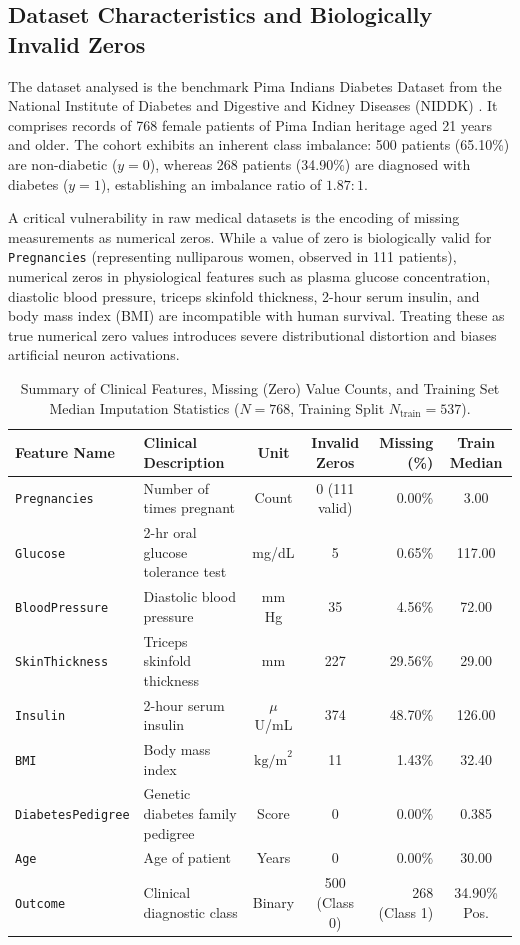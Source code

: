 \documentclass[11pt,a4paper]{article}
\begin{document}
\subsection{Dataset Characteristics and Biologically Invalid Zeros}
The dataset analysed is the benchmark Pima Indians Diabetes Dataset from the National Institute of Diabetes and Digestive and Kidney Diseases (NIDDK) \cite{smith1988using}. It comprises records of 768 female patients of Pima Indian heritage aged 21 years and older. The cohort exhibits an inherent class imbalance: 500 patients (65.10\%) are non-diabetic ($y=0$), whereas 268 patients (34.90\%) are diagnosed with diabetes ($y=1$), establishing an imbalance ratio of $1.87:1$.

A critical vulnerability in raw medical datasets is the encoding of missing measurements as numerical zeros. While a value of zero is biologically valid for \texttt{Pregnancies} (representing nulliparous women, observed in 111 patients), numerical zeros in physiological features such as plasma glucose concentration, diastolic blood pressure, triceps skinfold thickness, 2-hour serum insulin, and body mass index (BMI) are incompatible with human survival. Treating these as true numerical zero values introduces severe distributional distortion and biases artificial neuron activations.

\begin{table}[H]
    \centering
    \small
    \caption{Summary of Clinical Features, Missing (Zero) Value Counts, and Training Set Median Imputation Statistics ($N=768$, Training Split $N_{\text{train}}=537$).}
    \label{tab:features_summary}
    \begin{tabular}{@{}llccrc@{}}
        \toprule
        \textbf{Feature Name} & \textbf{Clinical Description} & \textbf{Unit} & \textbf{Invalid Zeros} & \textbf{Missing (\%)} & \textbf{Train Median} \\
        \midrule
        \texttt{Pregnancies} & Number of times pregnant & Count & 0 (111 valid) & 0.00\% & 3.00 \\
        \texttt{Glucose} & 2-hr oral glucose tolerance test & mg/dL & 5 & 0.65\% & 117.00 \\
        \texttt{BloodPressure} & Diastolic blood pressure & mm Hg & 35 & 4.56\% & 72.00 \\
        \texttt{SkinThickness} & Triceps skinfold thickness & mm & 227 & 29.56\% & 29.00 \\
        \texttt{Insulin} & 2-hour serum insulin & $\mu$U/mL & 374 & 48.70\% & 126.00 \\
        \texttt{BMI} & Body mass index & $\text{kg/m}^2$ & 11 & 1.43\% & 32.40 \\
        \texttt{DiabetesPedigree} & Genetic diabetes family pedigree & Score & 0 & 0.00\% & 0.385 \\
        \texttt{Age} & Age of patient & Years & 0 & 0.00\% & 30.00 \\
        \midrule
        \texttt{Outcome} & Clinical diagnostic class & Binary & 500 (Class 0) & 268 (Class 1) & 34.90\% Pos. \\
        \bottomrule
    \end{tabular}
\end{table}
\end{document}
